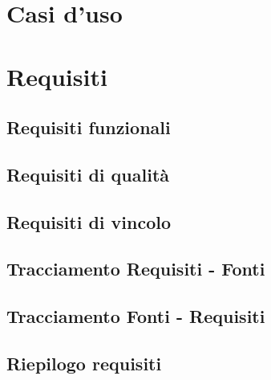 %
%
%

\section{Casi d'uso}

\newpage
\section{Requisiti}
\subsection{Requisiti funzionali}

\newpage
\subsection{Requisiti di qualità}

\newpage
\subsection{Requisiti di vincolo}

\newpage
\subsection{Tracciamento Requisiti - Fonti}

\newpage
\subsection{Tracciamento Fonti - Requisiti}

\newpage
\subsection{Riepilogo requisiti}

\newpage
